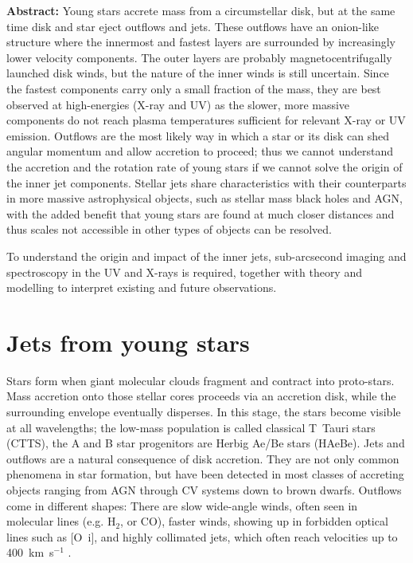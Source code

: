 \documentclass[12pt]{article}
\begin{document}
\textbf{Abstract:}
Young stars accrete mass from a circumstellar disk, but at the same time disk and star eject outflows and jets. These outflows have an onion-like structure where the innermost and fastest layers are surrounded by increasingly lower velocity components. The outer layers are probably magnetocentrifugally launched disk winds, but the nature of the inner winds is still uncertain. Since the fastest components carry only a small fraction of the mass, they are best observed at high-energies (X-ray and UV) as the  slower, more massive components do not reach plasma temperatures sufficient for relevant X-ray or UV emission. Outflows are the most likely way in which a star or its disk can shed angular momentum and allow accretion to proceed; thus we cannot understand the accretion and the rotation rate of young stars if we cannot solve the origin of the inner jet components. Stellar jets share characteristics with their counterparts in more massive astrophysical objects, such as stellar mass black holes and AGN, with the added benefit that young stars are found at much closer distances and thus scales not accessible in other types of objects can be resolved.

To understand the origin and impact of the inner jets, sub-arcsecond imaging and spectroscopy in the UV and X-rays is required, together with theory and modelling to interpret existing and future observations. 

\setlength{\parindent}{2em}

\pagebreak
\section{Jets from young stars}
Stars form when giant molecular clouds fragment and contract into
proto-stars. Mass accretion onto those stellar cores proceeds via an accretion
disk, while the surrounding envelope eventually disperses. In this stage, the
stars become visible at all wavelengths; the low-mass population is called
classical T~Tauri stars (CTTS), the A and B star progenitors are Herbig Ae/Be
stars (HAeBe). Jets and outflows are a natural consequence of disk
accretion. They are not only common phenomena in star formation, but have been
detected in most classes of accreting objects ranging from AGN through CV
systems down to brown dwarfs. Outflows come in different shapes: There are slow
wide-angle winds, often seen in molecular lines (e.g. H$_2$, or CO), faster winds,
showing up in forbidden optical lines such as [O~{\sc i}], and highly collimated jets, which often reach velocities up to 400~km~s$^{-1}$ \citep{1998AJ....115.1554E}. 
\end{document}
